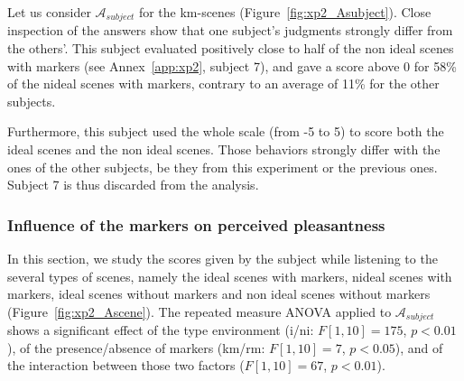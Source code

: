 \documentclass[12pt]{elsarticle}
\begin{document}
Let us consider $\mathcal{A}_{subject}$ for the km-scenes (Figure~\ref{fig:xp2_Asubject}). Close inspection of the answers show that one subject's judgments strongly differ from the others'. This subject evaluated positively close to half of the non ideal scenes with markers (see Annex~\ref{app:xp2}, subject 7), and gave a score above 0 for 58\% of the nideal scenes with markers, contrary to an average of 11\% for the other subjects.

Furthermore, this subject used the whole scale (from -5 to 5) to score both the ideal scenes and the non ideal scenes. Those behaviors strongly differ with the ones of the other subjects, be they from this experiment or the previous ones. Subject 7 is thus discarded from the analysis.

\subsubsection{Influence of the markers on perceived pleasantness}


In this section, we study the scores given by the subject while listening to the several types of scenes, namely the ideal scenes with markers, nideal scenes with markers, ideal scenes without markers and non ideal scenes without markers (Figure~\ref{fig:xp2_Ascene}). The repeated measure ANOVA applied to $\mathcal{A}_{subject}$ shows a significant effect of the type environment (i/ni: $F[1,10]=175$, $p<0.01$), of the presence/absence of markers (km/rm: $F[1,10]=7$, $p<0.05$), and of the interaction between those two factors ($F[1,10]=67$, $p<0.01$).


\end{document}

